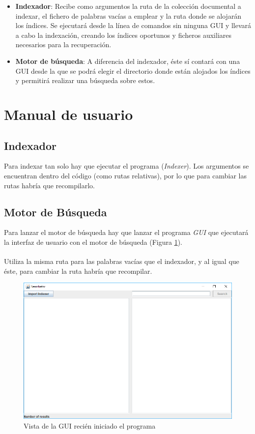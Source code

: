 \begin{itemize}
	\item \textbf{Indexador}: Recibe como argumentos la ruta de la colección documental a indexar, el fichero de palabras vacías a emplear y la ruta donde se alojarán los índices. Se ejecutará desde la línea de comandos sin ninguna GUI y llevará a cabo la indexación, creando los índices oportunos y ficheros auxiliares necesarios para la recuperación.
	\item \textbf{Motor de búsqueda}: A diferencia del indexador, éste sí contará con una GUI desde la que se podrá elegir el directorio donde están alojados los índices y permitirá realizar una búsqueda sobre estos.
\end{itemize}

\section{Manual de usuario}
\label{sec:manual}

\subsection{Indexador}

Para indexar tan solo hay que ejecutar el programa (\textit{Indexer}). Los argumentos se encuentran dentro del código (como rutas relativas), por lo que para cambiar las rutas habría que recompilarlo.

\subsection{Motor de Búsqueda}

Para lanzar el motor de búsqueda hay que lanzar el programa \textit{GUI} que ejecutará la interfaz de usuario con el motor de búsqueda (Figura \ref{fig:init}).
\\ \\
Utiliza la misma ruta para las palabras vacías que el indexador, y al igual que éste, para cambiar la ruta habría que recompilar.

\begin{figure}[H]
	\centering
	\includegraphics[width=12cm]{img/init}
	\caption{Vista de la GUI recién iniciado el programa}
	\label{fig:init}
\end{figure}


